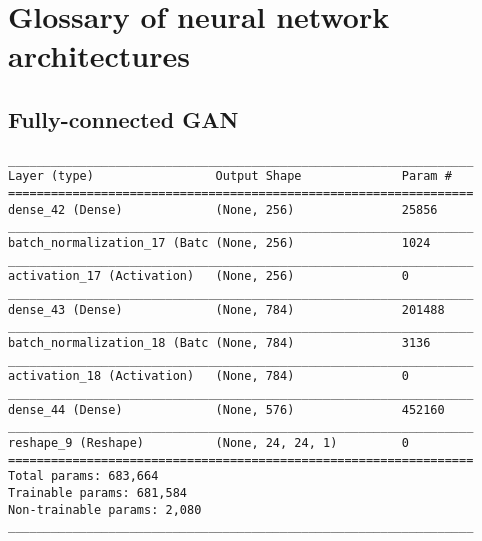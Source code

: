 
\chapter{Glossary of neural network architectures} %

\label{AppendixB} %


\section{Fully-connected GAN}
\label{appendix:fcgan}

\begin{verbatim}
_________________________________________________________________
Layer (type)                 Output Shape              Param #   
=================================================================
dense_42 (Dense)             (None, 256)               25856     
_________________________________________________________________
batch_normalization_17 (Batc (None, 256)               1024      
_________________________________________________________________
activation_17 (Activation)   (None, 256)               0         
_________________________________________________________________
dense_43 (Dense)             (None, 784)               201488    
_________________________________________________________________
batch_normalization_18 (Batc (None, 784)               3136      
_________________________________________________________________
activation_18 (Activation)   (None, 784)               0         
_________________________________________________________________
dense_44 (Dense)             (None, 576)               452160    
_________________________________________________________________
reshape_9 (Reshape)          (None, 24, 24, 1)         0         
=================================================================
Total params: 683,664
Trainable params: 681,584
Non-trainable params: 2,080
_________________________________________________________________
\end{verbatim}


